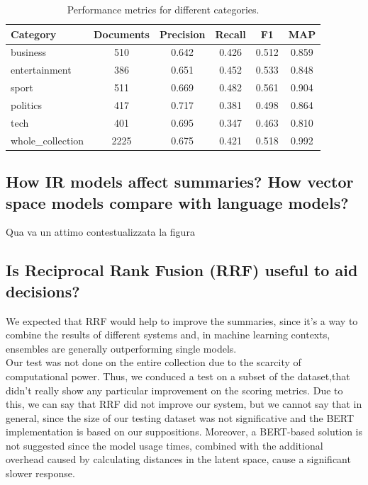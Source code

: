 \begin{center}
    \begin{table}[H]
        \centering
        \begin{tabular}{|l|c|c|c|c|c|}
            \hline
            Category          & Documents & Precision & Recall & F1    & MAP   \\
            \hline
            business          & 510       & 0.642     & 0.426  & 0.512 & 0.859 \\
            entertainment     & 386       & 0.651     & 0.452  & 0.533 & 0.848 \\
            sport             & 511       & 0.669     & 0.482  & 0.561 & 0.904 \\
            politics          & 417       & 0.717     & 0.381  & 0.498 & 0.864 \\
            tech              & 401       & 0.695     & 0.347  & 0.463 & 0.810 \\
            \hline
            whole\_collection & 2225      & 0.675     & 0.421  & 0.518 & 0.992 \\
            \hline
        \end{tabular}
        \caption{Performance metrics for different categories.}
        \label{tab:performance}
    \end{table}
\end{center}

\subsection{How IR models affect summaries? How vector space models compare with language models?}
Qua va un attimo contestualizzata la figura
\subsection{Is Reciprocal Rank Fusion (RRF) useful to aid decisions?}
We expected that RRF would help to improve the summaries, since it's a way to
combine the results of different systems and, in machine learning contexts,
ensembles are generally outperforming single models. \\ Our test was not done
on the entire collection due to the scarcity of computational power. Thus, we
conduced a test on a subset of the dataset,that didn't really show any
particular improvement on the scoring metrics. Due to this, we can say that RRF
did not improve our system, but we cannot say that in general, since the size
of our testing dataset was not significative and the BERT implementation is
based on our suppositions. Moreover, a BERT-based solution is not suggested
since the model usage times, combined with the additional overhead caused by
calculating distances in the latent space, cause a significant slower response.


